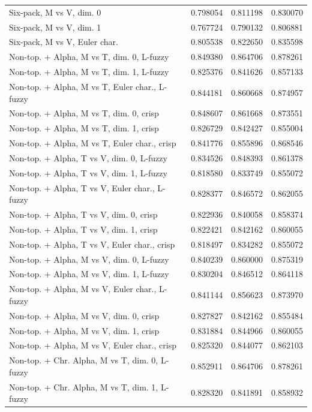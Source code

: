 \begin{longtable}{lrrr}
Six-pack, M vs V, dim. 0 & 0.798054 & 0.811198 & 0.830070 \\
Six-pack, M vs V, dim. 1 & 0.767724 & 0.790132 & 0.806881 \\
Six-pack, M vs V, Euler char. & 0.805538 & 0.822650 & 0.835598 \\
Non-top. + Alpha, M vs T, dim. 0, L-fuzzy & 0.849380 & 0.864706 & 0.878261 \\
Non-top. + Alpha, M vs T, dim. 1, L-fuzzy & 0.825376 & 0.841626 & 0.857133 \\
Non-top. + Alpha, M vs T, Euler char., L-fuzzy & 0.844181 & 0.860668 & 0.874957 \\
Non-top. + Alpha, M vs T, dim. 0, crisp & 0.848607 & 0.861668 & 0.873551 \\
Non-top. + Alpha, M vs T, dim. 1, crisp & 0.826729 & 0.842427 & 0.855004 \\
Non-top. + Alpha, M vs T, Euler char., crisp & 0.841776 & 0.855896 & 0.868546 \\
Non-top. + Alpha, T vs V, dim. 0, L-fuzzy & 0.834526 & 0.848393 & 0.861378 \\
Non-top. + Alpha, T vs V, dim. 1, L-fuzzy & 0.818580 & 0.833749 & 0.855072 \\
Non-top. + Alpha, T vs V, Euler char., L-fuzzy & 0.828377 & 0.846572 & 0.862055 \\
Non-top. + Alpha, T vs V, dim. 0, crisp & 0.822936 & 0.840058 & 0.858374 \\
Non-top. + Alpha, T vs V, dim. 1, crisp & 0.822421 & 0.842162 & 0.860055 \\
Non-top. + Alpha, T vs V, Euler char., crisp & 0.818497 & 0.834282 & 0.855072 \\
Non-top. + Alpha, M vs V, dim. 0, L-fuzzy & 0.840239 & 0.860000 & 0.875319 \\
Non-top. + Alpha, M vs V, dim. 1, L-fuzzy & 0.830204 & 0.846512 & 0.864118 \\
Non-top. + Alpha, M vs V, Euler char., L-fuzzy & 0.841144 & 0.856623 & 0.873970 \\
Non-top. + Alpha, M vs V, dim. 0, crisp & 0.827827 & 0.842162 & 0.855484 \\
Non-top. + Alpha, M vs V, dim. 1, crisp & 0.831884 & 0.844966 & 0.860055 \\
Non-top. + Alpha, M vs V, Euler char., crisp & 0.825320 & 0.844077 & 0.862103 \\
Non-top. + Chr. Alpha, M vs T, dim. 0, L-fuzzy & 0.852911 & 0.864706 & 0.878261 \\
Non-top. + Chr. Alpha, M vs T, dim. 1, L-fuzzy & 0.828320 & 0.841891 & 0.858932 \\

\end{longtable}
